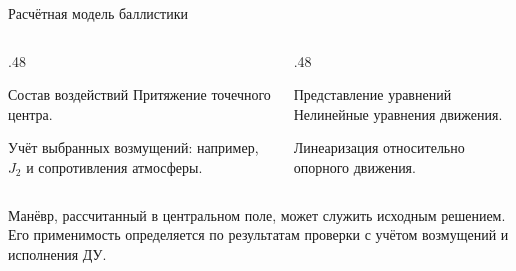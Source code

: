 \documentclass[11pt,aspectratio=169,t]{beamer}
\begin{document}
\begin{frame}{Расчётная модель баллистики}
\begin{columns}[T,onlytextwidth]
\begin{column}{.48\textwidth}
\begin{block}{Состав воздействий}
Притяжение точечного центра.\par\smallskip
Учёт выбранных возмущений: например, $J_2$ и сопротивления атмосферы.
\end{block}
\end{column}
\begin{column}{.48\textwidth}
\begin{block}{Представление уравнений}
Нелинейные уравнения движения.\par\smallskip
Линеаризация относительно опорного движения.
\end{block}
\end{column}
\end{columns}
\medskip
\centering
{}
\par\medskip
{\justifying
Манёвр, рассчитанный в центральном поле, может служить исходным решением. Его применимость определяется по результатам проверки с учётом возмущений и исполнения ДУ.\par}
\end{frame}
\end{document}
